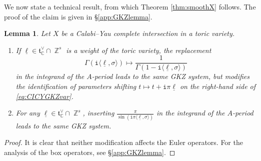 \documentclass[12pt,a4paper,oneside]{amsart}
\numberwithin{equation}{section}
\newtheorem{lem}[thm]{Lemma}
\theoremstyle{definition}
\theoremstyle{remark}
\DeclareMathOperator{\C}{\mathbb{C}}
\DeclareMathOperator{\Z}{\mathbb{Z}}
\newcommand{\ii}{\mathtt{i}}
\begin{document}
We now state a technical result, from which Theorem \ref{thm:smoothX} follows. The proof of the claim is given in \S\ref{app:GKZlemma}.
\begin{lem}\label{lemma:GKZlemma}
	Let $X$ be a Calabi--Yau complete intersection in a toric variety. 
	\begin{enumerate}[(1)]
    \item If $\underline{\ell} \in \mathfrak{t}_{\C}^{\vee} \cap \Z^s$ is a weight of the toric variety, the replacement 
		\begin{equation*}
			 \Gamma \left( \ii \langle \underline{\ell}, \sigma \rangle \right) \mapsto \frac{1}{ \Gamma \left( 1- \ii \langle \underline{\ell}, \sigma \rangle \right)} 
		\end{equation*}
		in the integrand of the $A$-period leads to the same GKZ system, but modifies the identification of parameters shifting $t \mapsto t+\ii \pi \underline{\ell}$ on the right-hand side of \eqref{eq:CICYGKZvar}.
		\item For any $\underline{\ell} \in \mathfrak{t}_{\C}^{\vee} \cap \Z^s$, inserting $\frac{\pi}{\sin \left( \ii \pi \langle\underline{\ell}, \sigma \rangle\right)}$ in the integrand of the $A$-period leads to the same GKZ system.
	\end{enumerate}
\end{lem}
\begin{proof}It is clear that neither modification affects the Euler operators. For the analysis of the box operators, see \S\ref{app:GKZlemma}.\end{proof}
\end{document}
